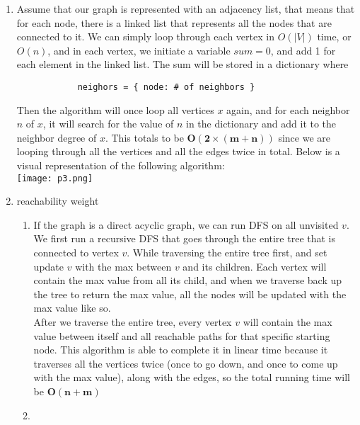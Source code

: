 \documentclass{article}
\begin{document}
\begin{enumerate}
        \item Assume that our graph is represented with an adjacency list, that means that for each node, there is a linked list that represents all the nodes that are connected to it. We can simply loop through each vertex in $O(|V|)$ time, or $O(n)$, and in each vertex, we initiate a variable $sum = 0$, and add 1 for each element in the linked list. The sum will be stored in a dictionary where
        \begin{verbatim}
            neighors = { node: # of neighbors }
        \end{verbatim}
        Then the algorithm will once loop all vertices $x$ again, and for each neighbor $n$ of $x$, it will search for the value of $n$ in the dictionary and add it to the neighbor degree of $x$. This totals to be $\boxed{\mathbf{O(2 \times (m + n))}}$ since we are looping through all the vertices and all the edges twice in total. Below is a visual representation of the following algorithm:\\
        \texttt{[image: p3.png]}
        \item reachability weight
        \begin{enumerate}
            \item If the graph is a direct acyclic graph, we can run DFS on all unvisited $v$. We first run a recursive DFS that goes through the entire tree that is connected to vertex $v$. While traversing the entire tree first, and set update $v$ with the max between $v$ and its children. Each vertex will contain the max value from all its child, and when we traverse back up the tree to return the max value, all the nodes will be updated with the max value like so.\\
            After we traverse the entire tree, every vertex $v$ will contain the max value between itself and all reachable paths for that specific starting node. This algorithm is able to complete it in linear time because it traverses all the vertices twice (once to go down, and once to come up with the max value), along with the edges, so the total running time will be $\boxed{\mathbf{O(n + m)}}$
            \item 
        \end{enumerate}

        
    \end{enumerate} 
\end{document}
